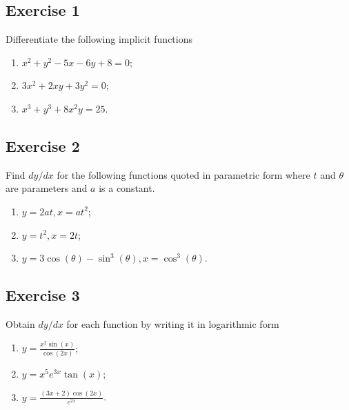 \documentclass[
  11pt,
  oneside]{book}
\providecommand{\tightlist}{%
  \setlength{\itemsep}{0pt}\setlength{\parskip}{0pt}}
\newcommand{\slide}{}
\theoremstyle{definition}
\theoremstyle{definition}
\theoremstyle{definition}
\theoremstyle{definition}
\theoremstyle{remark}
\begin{document}
\subsection*{Exercise 1}\label{exercise-1-5}

Differentiate the following implicit functions

\begin{enumerate}
\def\labelenumi{\roman{enumi}.}
\tightlist
\item
  \(x^2+y^2-5x-6y+8=0\);
\item
  \(3x^2+2xy+3y^2=0\);
\item
  \(x^3+y^3+8x^2y=25\).
\end{enumerate}

\slide

\subsection*{Exercise 2}\label{exercise-2-5}

Find \(dy/dx\) for the following functions quoted in parametric form where \(t\) and \(\theta\) are parameters and \(a\) is a constant.

\begin{enumerate}
\def\labelenumi{\roman{enumi}.}
\tightlist
\item
  \(y=2at, x = at^2\);
\item
  \(y=t^2, x = 2t\);
\item
  \(y=3\cos(\theta)-\sin^3(\theta), x = \cos^3(\theta)\).
\end{enumerate}

\slide

\subsection*{Exercise 3}\label{exercise-3-4}

Obtain \(dy/dx\) for each function by writing it in logarithmic form

\begin{enumerate}
\def\labelenumi{\roman{enumi}.}
\tightlist
\item
  \(y=\frac{x^2\sin(x)}{\cos(2x)}\);
\item
  \(y=x^5e^{3x}\tan(x)\);
\item
  \(y=\frac{(3x+2)\cos(2x)}{e^{2x}}\).
\end{enumerate}
\end{document}
